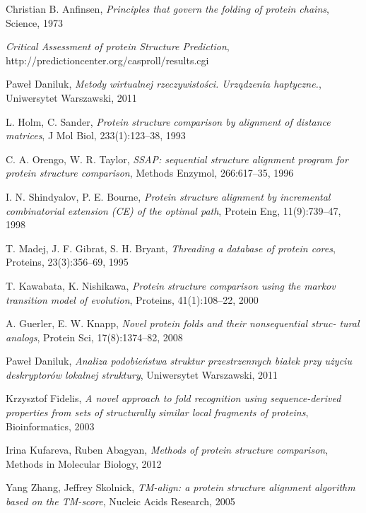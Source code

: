 \documentclass[licencjacka]{pracamgr}
\begin{document}
\begin{thebibliography}{99}

 Christian B. Anfinsen, \textit{Principles that govern the folding of protein chains}, Science, 1973

 \textit{Critical Assessment of protein Structure Prediction}, http://predictioncenter.org/casproll/results.cgi

 Paweł Daniluk, \textit{Metody wirtualnej rzeczywistości. Urządzenia haptyczne.}, Uniwersytet Warszawski, 2011 

 L. Holm, C. Sander, \textit{Protein structure comparison by alignment of distance matrices}, J Mol Biol, 233(1):123–38, 1993

 C. A. Orengo, W. R. Taylor, \textit{SSAP: sequential structure alignment program
for protein structure comparison}, Methods Enzymol, 266:617–35, 1996

 I. N. Shindyalov, P. E. Bourne, \textit{Protein structure alignment by incremental
combinatorial extension (CE) of the optimal path}, Protein Eng, 11(9):739–47, 1998

 T. Madej, J. F. Gibrat, S. H. Bryant, \textit{Threading a database of protein cores},
Proteins, 23(3):356–69, 1995

 T. Kawabata, K. Nishikawa, \textit{Protein structure comparison using the markov
transition model of evolution}, Proteins, 41(1):108–22, 2000
 
 A. Guerler, E. W. Knapp, \textit{Novel protein folds and their nonsequential struc-
tural analogs}, Protein Sci, 17(8):1374–82, 2008

 Paweł Daniluk, \textit{Analiza podobieństwa struktur przestrzennych białek przy użyciu deskryptorów lokalnej struktury}, Uniwersytet Warszawski, 2011

 Krzysztof Fidelis, \textit{A novel approach to fold recognition using sequence-derived properties from sets of structurally similar local fragments of proteins}, Bioinformatics, 2003

 Irina Kufareva, Ruben Abagyan, \textit{Methods of protein structure comparison}, Methods in Molecular Biology, 2012

 Yang Zhang, Jeffrey Skolnick, \textit{TM-align: a protein structure alignment algorithm based on the TM-score}, Nucleic Acids Research, 2005


\end{thebibliography}
\end{document}
